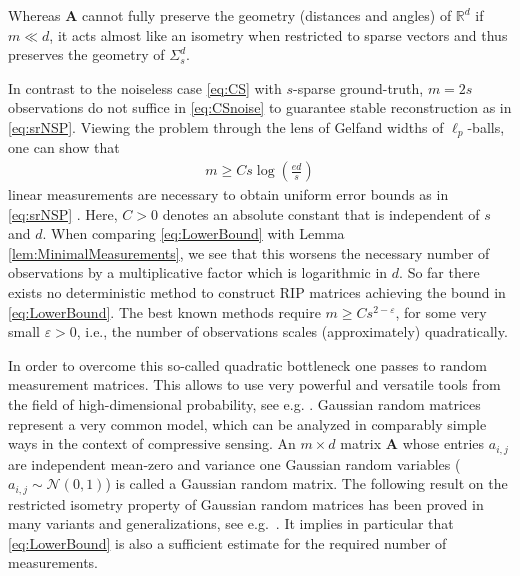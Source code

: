 \documentclass{svproc}
\newcommand{\corr}[1]{#1}
\newcommand{\bA}{\boldsymbol{A}}
\newcommand{\0}{\boldsymbol{0}}
\newcommand{\1}{\boldsymbol{1}}
\def\R{\mathbb{R}}
\begin{document}
Whereas $\bA$ cannot fully preserve the geometry (distances and angles) of $\R^d$ if $m \ll d$, it acts almost like an isometry when restricted to sparse vectors and thus preserves the geometry of $\Sigma_s^d$. 

In contrast to the noiseless case \eqref{eq:CS} with $s$-sparse ground-truth, $m = 2s$ observations do not suffice in \eqref{eq:CSnoise} to guarantee stable reconstruction as in \eqref{eq:srNSP}. Viewing the problem through the lens of Gelfand widths of $\ell_p$-balls, one can show that
\begin{align} \label{eq:LowerBound}
    m \ge Cs \log \left( \frac{ed}{s} \right)
\end{align}
linear measurements are necessary to obtain uniform error bounds as in \eqref{eq:srNSP} \cite{cohen2009compressed}. Here, $C > 0$ denotes an absolute constant that is independent of $s$ and $d$. When comparing \eqref{eq:LowerBound} with Lemma \ref{lem:MinimalMeasurements}, we see that this worsens the necessary number of observations by a multiplicative factor which is logarithmic in $d$. So far there exists no deterministic method to construct RIP matrices achieving the bound in \eqref{eq:LowerBound}. The best known methods \cite{bodifokoku11} require $m \ge C s^{2-\varepsilon}$, for some very small $\varepsilon >0$, i.e., the number of observations scales (approximately) quadratically. 

In order to overcome this so-called quadratic bottleneck one passes to random measurement matrices. This allows to use very powerful and versatile tools from the field of high-dimensional probability, see e.g. \cite{vershynin2010introduction}. 
Gaussian random matrices represent a very common model, which can be analyzed in comparably simple ways in the context of compressive sensing.
An \corr{$m \times d$ matrix $\bA$} whose entries
$a_{i,j}$ are independent mean-zero and variance one Gaussian random variables ($a_{i,j} \sim \mathcal{N}(0,1)$) is called a Gaussian random matrix. The following result on the restricted isometry property of Gaussian random matrices has been proved in many variants and generalizations, see e.g.\ \cite{candes2006near,Baraniuk2008,mepato09,foucart2013mathematical}. It implies in particular that \eqref{eq:LowerBound} is also a sufficient estimate for the required number of measurements.
\end{document}
